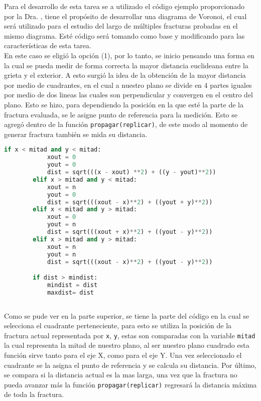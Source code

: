 \documentclass{article}
\begin{document}
Para el desarrollo de esta tarea se a utilizado el código ejemplo proporcionado por la Dra. \citet{DRA.Code}, tiene el propósito de desarrollar una diagrama de Voronoi, el cual será utilizado para el estudio del largo de múltiples fracturas probadas en el mismo diagrama. Esté código será  tomando como base y modificando para las características de esta tarea.\\

En este caso se eligió la opción (1), por lo tanto, se inicio pensando una forma en la cual se pueda medir de forma correcta la mayor distancia euclideana entre la grieta y el exterior. A esto surgió la idea de la obtención de la mayor distancia por medio de cuadrantes, en el cual a nuestro plano se divide en 4 partes iguales por medio de dos lineas las cuales son perpendicular y convergen en el centro del plano. Esto se hizo, para dependiendo la posición en la  que esté la parte de la fractura evaluada, se le asigne punto de referencia  para la medición. Esto se agregó dentro de la función \texttt{propagar(replicar)}, de este modo al momento de generar fractura también se mida su distancia. \\

\begin{lstlisting}[language=Python]
        if x < mitad and y < mitad:
            xout = 0
            yout = 0
            dist = sqrt(((x - xout) **2) + ((y - yout)**2))
        elif x > mitad and y < mitad:
            xout = n
            yout = 0
            dist = sqrt(((xout - x)**2) + ((yout + y)**2))
        elif x < mitad and y > mitad:
            xout = 0
            yout = n
            dist = sqrt(((xout + x)**2) + ((yout - y)**2))
        elif x > mitad and y > mitad:
            xout = n
            yout = n
            dist = sqrt(((xout - x)**2) + ((yout - y)**2))

        if dist > mindist:
            mindist = dist
            maxdist= dist
            
 \end{lstlisting}
 
Como se pude ver en la parte superior, se tiene la parte del código en la cual se selecciona el cuadrante perteneciente, para esto se utiliza la posición de la fractura actual representada por \texttt{x}, \texttt{y}, estas son comparadas con la variable \texttt{mitad} la cual representa la mitad de nuestro plano, al ser nuestro plano cuadrado esta función sirve tanto para el eje X, como para el eje Y. Una vez seleccionado el cuadrante se la asigna el punto de referencia y se calcula su distancia. Por último, se compara si la distancia actual es la mas larga, una vez que la fractura no pueda avanzar más la función \texttt{propagar(replicar)} regresará  la distancia máxima de toda la fractura.\\
\end{document}
